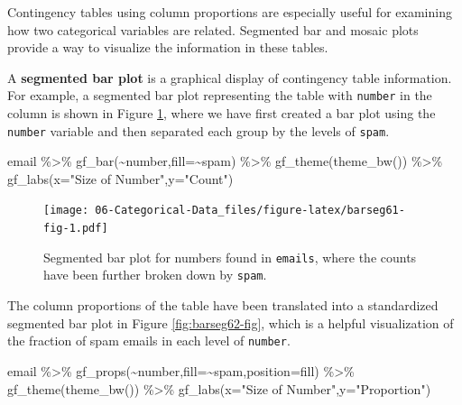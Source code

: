 \documentclass[
]{book}
\newenvironment{Shaded}{\begin{snugshade}}{\end{snugshade}}
\newcommand{\AttributeTok}[1]{\textcolor[rgb]{0.77,0.63,0.00}{#1}}
\newcommand{\FunctionTok}[1]{\textcolor[rgb]{0.00,0.00,0.00}{#1}}
\newcommand{\NormalTok}[1]{#1}
\newcommand{\SpecialCharTok}[1]{\textcolor[rgb]{0.00,0.00,0.00}{#1}}
\newcommand{\StringTok}[1]{\textcolor[rgb]{0.31,0.60,0.02}{#1}}
\begin{document}
Contingency tables using column proportions are especially useful for examining how two categorical variables are related. Segmented bar and mosaic plots provide a way to visualize the information in these tables.

A \textbf{segmented bar plot} is a graphical display of contingency table information. For example, a segmented bar plot representing the table with \texttt{number} in the column is shown in Figure \ref{fig:barseg61-fig}, where we have first created a bar plot using the \texttt{number} variable and then separated each group by the levels of \texttt{spam}.



\begin{Shaded}
\begin{Highlighting}[]
\NormalTok{email }\SpecialCharTok{\%\textgreater{}\%}
  \FunctionTok{gf\_bar}\NormalTok{(}\SpecialCharTok{\textasciitilde{}}\NormalTok{number,}\AttributeTok{fill=}\SpecialCharTok{\textasciitilde{}}\NormalTok{spam) }\SpecialCharTok{\%\textgreater{}\%}
  \FunctionTok{gf\_theme}\NormalTok{(}\FunctionTok{theme\_bw}\NormalTok{()) }\SpecialCharTok{\%\textgreater{}\%}
  \FunctionTok{gf\_labs}\NormalTok{(}\AttributeTok{x=}\StringTok{"Size of Number"}\NormalTok{,}\AttributeTok{y=}\StringTok{"Count"}\NormalTok{)}
\end{Highlighting}
\end{Shaded}

\begin{figure}
\centering
\texttt{[image: 06-Categorical-Data\_files/figure-latex/barseg61-fig-1.pdf]}
\caption{\label{fig:barseg61-fig}Segmented bar plot for numbers found in \texttt{emails}, where the counts have been further broken down by \texttt{spam}.}
\end{figure}

The column proportions of the table have been translated into a standardized segmented bar plot in Figure \ref{fig:barseg62-fig}, which is a helpful visualization of the fraction of spam emails in each level of \texttt{number}.



\begin{Shaded}
\begin{Highlighting}[]
\NormalTok{email }\SpecialCharTok{\%\textgreater{}\%}
  \FunctionTok{gf\_props}\NormalTok{(}\SpecialCharTok{\textasciitilde{}}\NormalTok{number,}\AttributeTok{fill=}\SpecialCharTok{\textasciitilde{}}\NormalTok{spam,}\AttributeTok{position=}\StringTok{\textquotesingle{}fill\textquotesingle{}}\NormalTok{) }\SpecialCharTok{\%\textgreater{}\%}
  \FunctionTok{gf\_theme}\NormalTok{(}\FunctionTok{theme\_bw}\NormalTok{()) }\SpecialCharTok{\%\textgreater{}\%}
  \FunctionTok{gf\_labs}\NormalTok{(}\AttributeTok{x=}\StringTok{"Size of Number"}\NormalTok{,}\AttributeTok{y=}\StringTok{"Proportion"}\NormalTok{)}
\end{Highlighting}
\end{Shaded}
\end{document}
